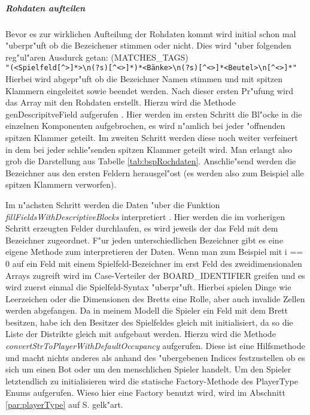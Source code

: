\subparagraph{Rohdaten aufteilen}
\label{spar:converter_ablauf}
Bevor es zur wirklichen Aufteilung der Rohdaten kommt wird initial schon mal "uberpr"uft ob die Bezeichener stimmen oder nicht. Dies wird "uber folgenden reg"ul"aren Ausdurck getan: (MATCHES\_TAGS)
\\ \verb|"(<Spielfeld[^>]*>\n(?s)[^<>]*)*<Bänke>\n(?s)[^<>]*<Beutel>\n[^<>]*"|
\\ Hierbei wird abgepr"uft ob die Bezeichner Namen stimmen und mit spitzen Klammern eingeleitet sowie beendet werden. Nach dieser ersten Pr"ufung wird das Array mit den Rohdaten erstellt. Hierzu wird die Methode genDescripitveField aufgerufen . Hier werden im ersten Schritt die Bl"ocke in die einzelnen Komponenten aufgebrochen, es wird n"amlich bei jeder "offnenden spitzen Klammer geteilt. Im zweiten Schritt werden diese noch weiter verfeinert in dem bei jeder schlie"senden spitzen Klammer geteilt wird. Man erlangt also grob die Darstellung aus Tabelle \ref{tab:bspRochdaten}. Anschlie"send werden die Bezeichner aus den ersten Feldern herausgel"ost (es werden also zum Beispiel alle spitzen Klammern verworfen).

Im n"achsten Schritt werden die Daten "uber die Funktion \emph{fillFieldsWithDescriptiveBlocks} interpretiert . Hier werden die im vorherigen Schritt erzeugten Felder durchlaufen, es wird jeweils der das Feld mit dem Bezeichner zugeordnet. F"ur jeden unterschiedlichen Bezeichner gibt es eine eigene Methode zum interpretieren der Daten. Wenn man zum Beispiel mit i == 0 auf ein Feld mit einem Spielfeld-Bezeichner im erst Feld des zweidimensionalen Arrays zugreift wird im Case-Verteiler der BOARD\_IDENTIFIER greifen und es wird zuerst einmal die Spielfeld-Syntax "uberpr"uft. Hierbei spielen Dinge wie Leerzeichen oder die Dimensionen des Bretts eine Rolle, aber auch invalide Zellen werden abgefangen. Da in meinem Modell die Spieler ein Feld mit dem Brett besitzen, habe ich den Besitzer des Spielfeldes gleich mit initialisiert, da so die Liste der Distrikte gleich mit aufgebaut werden. Hierzu wird die Methode \emph{convertStrToPlayerWithDefaultOccupancy} aufgerufen. Diese ist eine Hilfsmethode und macht nichts anderes als anhand des "ubergebenen Indices festzustellen ob es sich um einen Bot oder um den menschlichen Spieler handelt. Um den Spieler letztendlich zu initialisieren wird die statische Factory-Methode des PlayerType Enums aufgerufen. Wieso hier eine Factory benutzt wird, wird im Abschnitt \ref{par:playerType} auf S. \pageref{par:playerType} gelk"art. 


